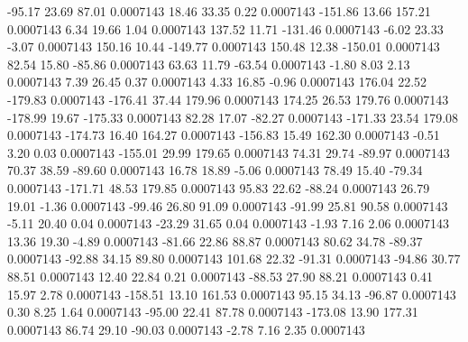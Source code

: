       -95.17       23.69       87.01     0.0007143
       18.46       33.35        0.22     0.0007143
     -151.86       13.66      157.21     0.0007143
        6.34       19.66        1.04     0.0007143
      137.52       11.71     -131.46     0.0007143
       -6.02       23.33       -3.07     0.0007143
      150.16       10.44     -149.77     0.0007143
      150.48       12.38     -150.01     0.0007143
       82.54       15.80      -85.86     0.0007143
       63.63       11.79      -63.54     0.0007143
       -1.80        8.03        2.13     0.0007143
        7.39       26.45        0.37     0.0007143
        4.33       16.85       -0.96     0.0007143
      176.04       22.52     -179.83     0.0007143
     -176.41       37.44      179.96     0.0007143
      174.25       26.53      179.76     0.0007143
     -178.99       19.67     -175.33     0.0007143
       82.28       17.07      -82.27     0.0007143
     -171.33       23.54      179.08     0.0007143
     -174.73       16.40      164.27     0.0007143
     -156.83       15.49      162.30     0.0007143
       -0.51        3.20        0.03     0.0007143
     -155.01       29.99      179.65     0.0007143
       74.31       29.74      -89.97     0.0007143
       70.37       38.59      -89.60     0.0007143
       16.78       18.89       -5.06     0.0007143
       78.49       15.40      -79.34     0.0007143
     -171.71       48.53      179.85     0.0007143
       95.83       22.62      -88.24     0.0007143
       26.79       19.01       -1.36     0.0007143
      -99.46       26.80       91.09     0.0007143
      -91.99       25.81       90.58     0.0007143
       -5.11       20.40        0.04     0.0007143
      -23.29       31.65        0.04     0.0007143
       -1.93        7.16        2.06     0.0007143
       13.36       19.30       -4.89     0.0007143
      -81.66       22.86       88.87     0.0007143
       80.62       34.78      -89.37     0.0007143
      -92.88       34.15       89.80     0.0007143
      101.68       22.32      -91.31     0.0007143
      -94.86       30.77       88.51     0.0007143
       12.40       22.84        0.21     0.0007143
      -88.53       27.90       88.21     0.0007143
        0.41       15.97        2.78     0.0007143
     -158.51       13.10      161.53     0.0007143
       95.15       34.13      -96.87     0.0007143
        0.30        8.25        1.64     0.0007143
      -95.00       22.41       87.78     0.0007143
     -173.08       13.90      177.31     0.0007143
       86.74       29.10      -90.03     0.0007143
       -2.78        7.16        2.35     0.0007143
